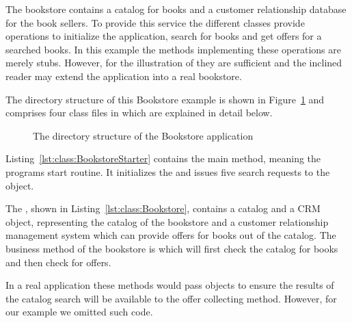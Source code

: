 \noindent The bookstore contains a catalog for books and a customer relationship database for the book sellers. To provide this service the different classes provide operations to initialize the application, search for books and get offers for a searched books. In this example the methods implementing these operations are merely stubs. However, for the illustration of \Kieker{} they are sufficient and the inclined reader may extend the application into a real bookstore. 

The directory structure of this Bookstore example is shown in Figure~\ref{fig:PlainBookstoreExample} and comprises four class files in  which are explained in detail below.

\begin{figure}[H]
\begin{graybox}
\end{graybox}

\caption{The directory structure of the Bookstore application}
\label{fig:PlainBookstoreExample}
\end{figure}

\noindent Listing~\ref{lst:class:BookstoreStarter} contains the main method, meaning the programs start routine. It initializes the  and issues five search requests to the  object.

\setJavaCodeListing



\noindent The , shown in Listing~\ref{lst:class:Bookstore}, contains a catalog and a CRM object, representing the catalog of the bookstore and a customer relationship management system which can provide offers for books out of the catalog. The business method of the bookstore is  which will first check the catalog for books and then check for offers.

In a real application these methods would pass objects to ensure the results of the catalog search will be available to the offer collecting method. However, for our example we omitted such code. 

